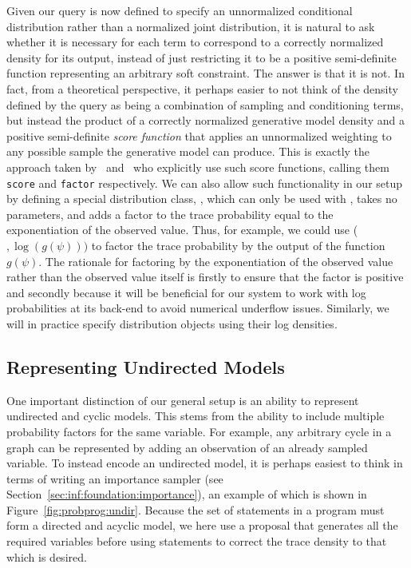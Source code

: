 Given our query is now defined to specify an unnormalized conditional distribution rather than a normalized
joint distribution, it is natural to ask whether it is necessary for each \observe term to correspond to
a correctly normalized density for its output, instead of just restricting it to be a positive semi-definite
function representing an arbitrary soft constraint.  The answer is that it is not.  In fact, from a theoretical perspective,
it perhaps easier to not think of the density defined by the query as being a combination of sampling and conditioning terms,
but instead the product of a correctly normalized generative
model density and a positive semi-definite \emph{score function} that applies an unnormalized weighting to any possible
sample the generative model can produce.  This is
exactly the approach taken by~\citep{staton2016semantics} and~\citep{goodman_book_2014} who explicitly use such
score functions, calling them {\small \texttt{score}} and {\small \texttt{factor}} respectively.
We can also allow such functionality in our setup by defining a
special distribution class, \boppfactor, which can only be used with \observe, takes no parameters, and 
adds a factor to the trace probability equal to the exponentiation of the observed value.  Thus, for example, we could use
\observe (\boppfactor$,\log(g(\psi)))$ to factor the trace probability by the output of the function $g(\psi)$.
The rationale for factoring by the exponentiation of the observed value rather than the observed value itself
is firstly to ensure that the factor is positive and secondly because it will be beneficial for
our system to work with log probabilities at its back-end to avoid numerical underflow issues.  Similarly,
we will in practice specify distribution objects using their log densities.

\subsection{Representing Undirected Models}
\label{sec:probprog:models:undirected}

One important distinction of our general setup 
is an ability to represent undirected and cyclic models.  This stems from the
ability to include multiple probability factors for the same variable.  For example, any arbitrary cycle in a graph
can be represented by adding an observation of an already sampled variable.  To instead encode an
undirected model, it is perhaps easiest to think in terms of writing an importance sampler 
(see Section~\ref{sec:inf:foundation:importance}), an example of which
is shown in Figure~\ref{fig:probprog:undir}.   Because the set of \sample statements in a program must
form a directed and acyclic model, we here use a proposal that generates all the required variables before
using \observe statements to correct the trace density to that which is desired.

